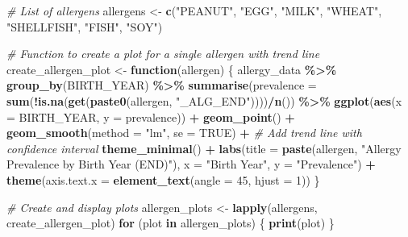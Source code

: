 \documentclass[
]{article}
\newenvironment{Shaded}{\begin{snugshade}}{\end{snugshade}}
\newcommand{\AttributeTok}[1]{\textcolor[rgb]{0.13,0.29,0.53}{#1}}
\newcommand{\CommentTok}[1]{\textcolor[rgb]{0.56,0.35,0.01}{\textit{#1}}}
\newcommand{\ConstantTok}[1]{\textcolor[rgb]{0.56,0.35,0.01}{#1}}
\newcommand{\ControlFlowTok}[1]{\textcolor[rgb]{0.13,0.29,0.53}{\textbf{#1}}}
\newcommand{\DecValTok}[1]{\textcolor[rgb]{0.00,0.00,0.81}{#1}}
\newcommand{\FunctionTok}[1]{\textcolor[rgb]{0.13,0.29,0.53}{\textbf{#1}}}
\newcommand{\NormalTok}[1]{#1}
\newcommand{\OtherTok}[1]{\textcolor[rgb]{0.56,0.35,0.01}{#1}}
\newcommand{\SpecialCharTok}[1]{\textcolor[rgb]{0.81,0.36,0.00}{\textbf{#1}}}
\newcommand{\StringTok}[1]{\textcolor[rgb]{0.31,0.60,0.02}{#1}}
\begin{document}
\begin{Shaded}
\begin{Highlighting}[]
\CommentTok{\# List of allergens}
\NormalTok{allergens }\OtherTok{\textless{}{-}} \FunctionTok{c}\NormalTok{(}\StringTok{"PEANUT"}\NormalTok{, }\StringTok{"EGG"}\NormalTok{, }\StringTok{"MILK"}\NormalTok{, }\StringTok{"WHEAT"}\NormalTok{, }\StringTok{"SHELLFISH"}\NormalTok{, }\StringTok{"FISH"}\NormalTok{, }\StringTok{"SOY"}\NormalTok{)}

\CommentTok{\# Function to create a plot for a single allergen with trend line}
\NormalTok{create\_allergen\_plot }\OtherTok{\textless{}{-}} \ControlFlowTok{function}\NormalTok{(allergen) \{}
\NormalTok{  allergy\_data }\SpecialCharTok{\%\textgreater{}\%}
    \FunctionTok{group\_by}\NormalTok{(BIRTH\_YEAR) }\SpecialCharTok{\%\textgreater{}\%}
    \FunctionTok{summarise}\NormalTok{(}\AttributeTok{prevalence =} \FunctionTok{sum}\NormalTok{(}\SpecialCharTok{!}\FunctionTok{is.na}\NormalTok{(}\FunctionTok{get}\NormalTok{(}\FunctionTok{paste0}\NormalTok{(allergen, }\StringTok{"\_ALG\_END"}\NormalTok{))))}\SpecialCharTok{/}\FunctionTok{n}\NormalTok{()) }\SpecialCharTok{\%\textgreater{}\%}
    \FunctionTok{ggplot}\NormalTok{(}\FunctionTok{aes}\NormalTok{(}\AttributeTok{x =}\NormalTok{ BIRTH\_YEAR, }\AttributeTok{y =}\NormalTok{ prevalence)) }\SpecialCharTok{+}
    \FunctionTok{geom\_point}\NormalTok{() }\SpecialCharTok{+}
    \FunctionTok{geom\_smooth}\NormalTok{(}\AttributeTok{method =} \StringTok{"lm"}\NormalTok{, }\AttributeTok{se =} \ConstantTok{TRUE}\NormalTok{) }\SpecialCharTok{+}  \CommentTok{\# Add trend line with confidence interval}
    \FunctionTok{theme\_minimal}\NormalTok{() }\SpecialCharTok{+}
    \FunctionTok{labs}\NormalTok{(}\AttributeTok{title =} \FunctionTok{paste}\NormalTok{(allergen, }\StringTok{"Allergy Prevalence by Birth Year (END)"}\NormalTok{),}
         \AttributeTok{x =} \StringTok{"Birth Year"}\NormalTok{,}
         \AttributeTok{y =} \StringTok{"Prevalence"}\NormalTok{) }\SpecialCharTok{+}
    \FunctionTok{theme}\NormalTok{(}\AttributeTok{axis.text.x =} \FunctionTok{element\_text}\NormalTok{(}\AttributeTok{angle =} \DecValTok{45}\NormalTok{, }\AttributeTok{hjust =} \DecValTok{1}\NormalTok{))}
\NormalTok{\}}

\CommentTok{\# Create and display plots}
\NormalTok{allergen\_plots }\OtherTok{\textless{}{-}} \FunctionTok{lapply}\NormalTok{(allergens, create\_allergen\_plot)}
\ControlFlowTok{for}\NormalTok{ (plot }\ControlFlowTok{in}\NormalTok{ allergen\_plots) \{}
  \FunctionTok{print}\NormalTok{(plot)}
\NormalTok{\}}
\end{Highlighting}
\end{Shaded}
\end{document}
